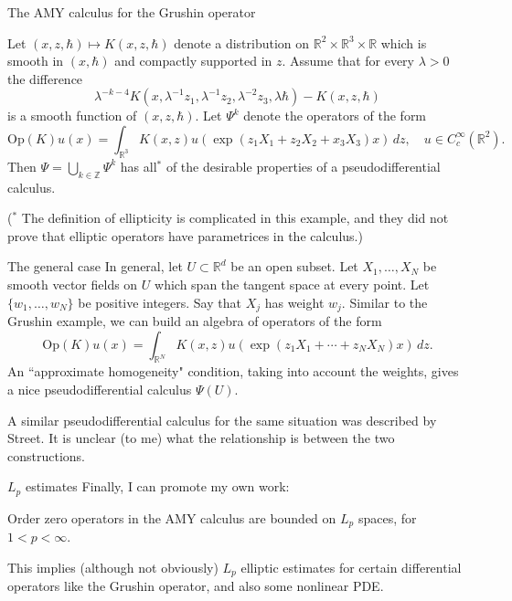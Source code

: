 \documentclass{beamer}
\numberwithin{equation}{section}
\theoremstyle{plain}
\theoremstyle{plain}
\theoremstyle{definition}
\theoremstyle{plain}
\theoremstyle{plain}
\theoremstyle{definition}
\newcommand{\Rl}{\mathbb{R}}
\newcommand{\Itgr}{\mathbb{Z}}
\newcommand{\Op}{\mathrm{Op}}
\begin{document}
\begin{frame}{The AMY calculus for the Grushin operator}
\begin{theorem}
    Let $(x,z,\hbar)\mapsto K(x,z,\hbar)$ denote a distribution on $\Rl^2\times\Rl^3\times \Rl$ which is smooth in $(x,\hbar)$ and compactly supported in $z.$ Assume that for every $\lambda>0$ the difference
    \[
        \lambda^{-k-4}K(x,\lambda^{-1}z_1,\lambda^{-1}z_2,\lambda^{-2}z_3,\lambda\hbar)-K(x,z,\hbar)
    \]
    is a smooth function of $(x,z,\hbar).$ Let $\Psi^k$ denote the operators of the form 
    \[
        \Op(K)u(x) = \int_{\Rl^3} K(x,z)u(\exp(z_1X_1+z_2X_2+x_3X_3)x)\,dz,\quad u\in C^\infty_c(\Rl^2).
    \]
    Then $\Psi = \bigcup_{k\in \Itgr} \Psi^k$ has all$^*$ of the desirable properties of a pseudodifferential calculus.
\end{theorem}
\pause
($^*$ The definition of ellipticity is complicated in this example, and they did not prove that elliptic operators have parametrices in the calculus.)
\end{frame}

\begin{frame}{The general case}
    In general, let $U\subset \Rl^d$ be an open subset. Let $X_1,\ldots,X_N$ be smooth vector fields on $U$ which span the tangent space at every point. Let $\{w_1,\ldots,w_N\}$ be positive integers. Say that $X_j$ has weight $w_j.$ 
    \pause
    Similar to the Grushin example, we can build an algebra of operators of the form
    \[
        \Op(K)u(x) = \int_{\Rl^N} K(x,z)u(\exp(z_1X_1+\cdots+z_NX_N)x)\,dz.
    \]
    An ``approximate homogeneity" condition, taking into account the weights, gives a nice pseudodifferential calculus $\Psi(U).$
    \pause
    
    
    A similar pseudodifferential calculus for the same situation was described by Street. It is unclear (to me) what the relationship is between the two constructions.
\end{frame}

\begin{frame}{$L_p$ estimates}
    Finally, I can promote my own work:
    \begin{theorem}[M. (2024)]
        Order zero operators in the AMY calculus are bounded on $L_p$ spaces, for $1<p<\infty.$
    \end{theorem}
    This implies (although not obviously) $L_p$ elliptic estimates for certain differential operators like the Grushin operator, and also some nonlinear PDE.
\end{frame}




\begin{frame}
\end{frame}
\end{document}
